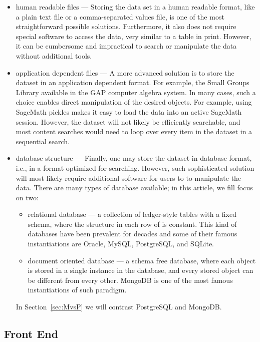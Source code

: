\documentclass{article}
\begin{document}
\begin{itemize}
  \item human readable files
    ---
     Storing the data set in a human readable format, like a  plain text file or a comma-separated values file, is one of the most straightforward possible solutions.
    Furthermore, it also does not require special software to access the data, very similar to a table in print.
    However, it can be cumbersome and impractical to search or manipulate the data without additional tools.
  \item application dependent files
    ---
    A more advanced solution is to store the dataset in an application dependent format.
    For example, the Small Groups Library available in the GAP computer algebra system. 
    In many cases, such a choice enables direct manipulation of the desired objects.
    For example, using SageMath pickles makes it easy to load the data into an active SageMath session.
    However, the dataset will not likely be efficiently searchable, and most content searches would need to loop over every item in the dataset in a sequential search.
  \item database structure
    ---
    Finally, one may store the dataset in database format, i.e., in a format optimized for searching.
    However, such sophisticated solution will most likely require additional software for users to to manipulate the data.
    There are many types of database available; in this article, we fill focus on two:
    \begin{itemize}
      \item relational database --- a collection of ledger-style tables with a fixed schema, where the structure in each row of is constant.
        This kind of databases have been prevalent for decades and some of their famous instantiations are Oracle, MySQL, PostgreSQL, and SQLite.
      \item document oriented database --- a schema free database, where each object is stored in a single instance in the database, and every stored object can be different from every other.
        MongoDB is one of the most famous instantiations of such paradigm.
    \end{itemize}
    In Section~\ref{sec:MvsP} we will contrast PostgreSQL and MongoDB.
\end{itemize}


\subsection{Front End}
\end{document}
